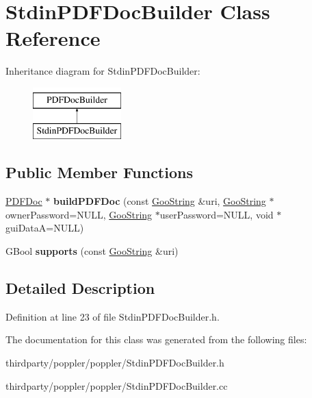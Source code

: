 \hypertarget{class_stdin_p_d_f_doc_builder}{}\section{Stdin\+P\+D\+F\+Doc\+Builder Class Reference}
\label{class_stdin_p_d_f_doc_builder}
Inheritance diagram for Stdin\+P\+D\+F\+Doc\+Builder\+:\begin{figure}[H]
\begin{center}
\leavevmode
\includegraphics[height=2.000000cm]{class_stdin_p_d_f_doc_builder}
\end{center}
\end{figure}
\subsection*{Public Member Functions}
\begin{DoxyCompactItemize}
\item 
\mbox{\label{class_stdin_p_d_f_doc_builder_adec1fc457961ca9a23647d70b5aec80c}} 
\hyperlink{class_p_d_f_doc}{P\+D\+F\+Doc} $\ast$ {\bfseries build\+P\+D\+F\+Doc} (const \hyperlink{class_goo_string}{Goo\+String} \&uri, \hyperlink{class_goo_string}{Goo\+String} $\ast$owner\+Password=N\+U\+LL, \hyperlink{class_goo_string}{Goo\+String} $\ast$user\+Password=N\+U\+LL, void $\ast$gui\+DataA=N\+U\+LL)
\item 
\mbox{\label{class_stdin_p_d_f_doc_builder_a87faf7661ca50f7d7202c6eb3f85d2cf}} 
G\+Bool {\bfseries supports} (const \hyperlink{class_goo_string}{Goo\+String} \&uri)
\end{DoxyCompactItemize}


\subsection{Detailed Description}


Definition at line 23 of file Stdin\+P\+D\+F\+Doc\+Builder.\+h.



The documentation for this class was generated from the following files\+:\begin{DoxyCompactItemize}
\item 
thirdparty/poppler/poppler/Stdin\+P\+D\+F\+Doc\+Builder.\+h\item 
thirdparty/poppler/poppler/Stdin\+P\+D\+F\+Doc\+Builder.\+cc\end{DoxyCompactItemize}
